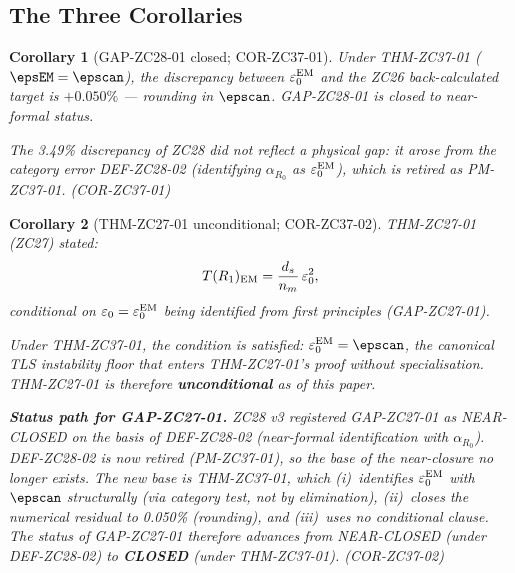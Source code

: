 \documentclass[12pt, a4paper]{article}
\newtheorem{corollary}{Corollary}[section]
\begin{document}
\subsection{The Three Corollaries}
\label{sec:corollaries}

\begin{corollary}[GAP-ZC28-01 closed; COR-ZC37-01]
\label{cor:gap-zc28-01}
Under THM-ZC37-01 ($\epsEM = \epscan$), the discrepancy
between $\varepsilon_0^{\rm EM}$ and the ZC26 back-calculated
target is $+0.050\%$ --- rounding in $\epscan$.
GAP-ZC28-01 is closed to near-formal status.

The 3.49\% discrepancy of ZC28 did not reflect a physical
gap: it arose from the category error DEF-ZC28-02
(identifying $\alpha_{R_0}$ as $\varepsilon_0^{\rm EM}$),
which is retired as PM-ZC37-01.
\hfill\textup{(COR-ZC37-01)}
\end{corollary}

\begin{corollary}[THM-ZC27-01 unconditional; COR-ZC37-02]
\label{cor:thm-zc27-01-uncond}
THM-ZC27-01 (ZC27) stated:
\[
  T(R_1)_{\rm EM} = \frac{d_s}{n_m}\,\varepsilon_0^2,
\]
\emph{conditional} on $\varepsilon_0 = \varepsilon_0^{\rm EM}$
being identified from first principles (GAP-ZC27-01).

Under THM-ZC37-01, the condition is satisfied:
$\varepsilon_0^{\rm EM} = \epscan$, the canonical TLS
instability floor that enters THM-ZC27-01's proof
without specialisation. THM-ZC27-01 is therefore
\textbf{unconditional} as of this paper.

\medskip
\textbf{Status path for GAP-ZC27-01.}
ZC28 v3 registered GAP-ZC27-01 as NEAR-CLOSED on the
basis of DEF-ZC28-02 (near-formal identification with
$\alpha_{R_0}$). DEF-ZC28-02 is now retired (PM-ZC37-01),
so the base of the near-closure no longer exists.
The new base is THM-ZC37-01, which (i)~identifies
$\varepsilon_0^{\rm EM}$ with $\epscan$ structurally
(via category test, not by elimination), (ii)~closes the
numerical residual to 0.050\% (rounding), and (iii)~uses
no conditional clause. The status of GAP-ZC27-01 therefore
advances from NEAR-CLOSED (under DEF-ZC28-02) to
\textbf{CLOSED} (under THM-ZC37-01).
\hfill\textup{(COR-ZC37-02)}
\end{corollary}
\end{document}
